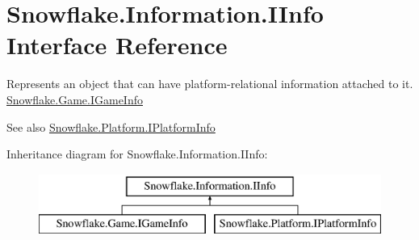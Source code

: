 \hypertarget{interface_snowflake_1_1_information_1_1_i_info}{}\section{Snowflake.\+Information.\+I\+Info Interface Reference}
\label{interface_snowflake_1_1_information_1_1_i_info}


Represents an object that can have platform-\/relational information attached to it. \hyperlink{interface_snowflake_1_1_game_1_1_i_game_info}{Snowflake.\+Game.\+I\+Game\+Info} \begin{DoxySeeAlso}{See also}
\hyperlink{interface_snowflake_1_1_platform_1_1_i_platform_info}{Snowflake.\+Platform.\+I\+Platform\+Info}


\end{DoxySeeAlso}
 


Inheritance diagram for Snowflake.\+Information.\+I\+Info\+:\begin{figure}[H]
\begin{center}
\leavevmode
\includegraphics[height=2.000000cm]{interface_snowflake_1_1_information_1_1_i_info}
\end{center}
\end{figure}
